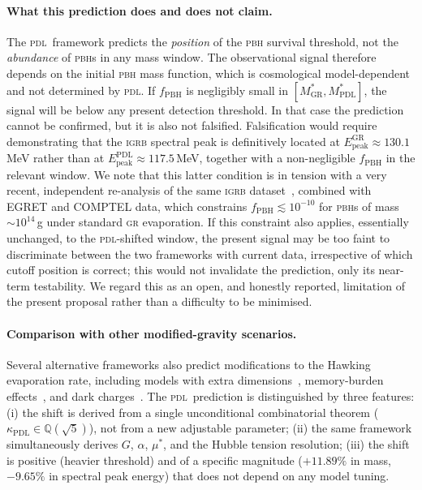\documentclass[12pt, a4paper]{article}
\theoremstyle{definition}
\newcommand{\PDL}{\textsc{pdl}}
\newcommand{\kappaPDL}{\kappa_{\mathrm{PDL}}}
\newcommand{\MstarGR}{M^{*}_{\mathrm{GR}}}
\newcommand{\MstarPDL}{M^{*}_{\mathrm{PDL}}}
\begin{document}
\paragraph{What this prediction does and does not claim.}
The \PDL\ framework predicts the \emph{position} of the \textsc{pbh} survival threshold, not the \emph{abundance} of \textsc{pbh}s in any mass window. The observational signal therefore depends on the initial \textsc{pbh} mass function, which is cosmological model-dependent and not determined by \PDL. If $f_{\mathrm{PBH}}$ is negligibly small in $[\MstarGR, \MstarPDL]$, the signal will be below any present detection threshold. In that case the prediction cannot be confirmed, but it is also not falsified. Falsification would require demonstrating that the \textsc{igrb} spectral peak is definitively located at $E_{\mathrm{peak}}^{\mathrm{GR}} \approx 130.1$\,MeV rather than at $E_{\mathrm{peak}}^{\mathrm{PDL}} \approx 117.5$\,MeV, together with a non-negligible $f_{\mathrm{PBH}}$ in the relevant window. We note that this latter condition is in tension with a very recent, independent re-analysis of the same \textsc{igrb} dataset~\cite{Cholis2026}, combined with \textsc{EGRET} and \textsc{COMPTEL} data, which constrains $f_{\mathrm{PBH}} \lesssim 10^{-10}$ for \textsc{pbh}s of mass $\sim10^{14}$\,g under standard \textsc{gr} evaporation. If this constraint also applies, essentially unchanged, to the \PDL-shifted window, the present signal may be too faint to discriminate between the two frameworks with current data, irrespective of which cutoff position is correct; this would not invalidate the prediction, only its near-term testability. We regard this as an open, and honestly reported, limitation of the present proposal rather than a difficulty to be minimised.

\paragraph{Comparison with other modified-gravity scenarios.}
Several alternative frameworks also predict modifications to the Hawking evaporation rate, including models with extra dimensions~\cite{Anchordoqui2022}, memory-burden effects~\cite{Thoss2024}, and dark charges~\cite{Korwar2023}. The \PDL\ prediction is distinguished by three features: (i) the shift is derived from a single unconditional combinatorial theorem ($\kappaPDL \in \mathbb{Q}(\sqrt{5})$), not from a new adjustable parameter; (ii) the same framework simultaneously derives $G$, $\alpha$, $\mu^*$, and the Hubble tension resolution; (iii) the shift is positive (heavier threshold) and of a specific magnitude ($+11.89\%$ in mass, $-9.65\%$ in spectral peak energy) that does not depend on any model tuning.
\end{document}
